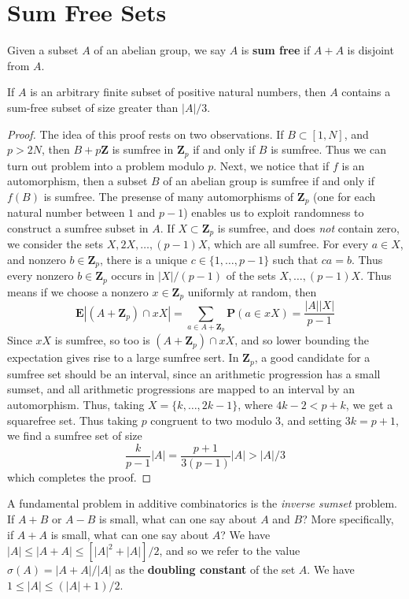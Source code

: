 \section{Sum Free Sets}

Given a subset $A$ of an abelian group, we say $A$ is {\bf sum free} if $A + A$ is disjoint from $A$.

\begin{theorem}
    If $A$ is an arbitrary finite subset of positive natural numbers, then $A$ contains a sum-free subset of size greater than $|A|/3$.
\end{theorem}
\begin{proof}
    The idea of this proof rests on two observations. If $B \subset [1,N]$, and $p > 2N$, then $B + p \mathbf{Z}$ is sumfree in $\mathbf{Z}_p$ if and only if $B$ is sumfree. Thus we can turn out problem into a problem modulo $p$. Next, we notice that if $f$ is an automorphism, then a subset $B$ of an abelian group is sumfree if and only if $f(B)$ is sumfree. The presense of many automorphisms of $\mathbf{Z}_p$ (one for each natural number between $1$ and $p-1$) enables us to exploit randomness to construct a sumfree subset in $A$. If $X \subset \mathbf{Z}_p$ is sumfree, and does {\it not} contain zero, we consider the sets $X,2X, \dots, (p-1)X$, which are all sumfree. For every $a \in X$, and nonzero $b \in \mathbf{Z}_p$, there is a unique $c \in \{ 1, \dots, p-1 \}$ such that $ca = b$. Thus every nonzero $b \in \mathbf{Z}_p$ occurs in $|X|/(p-1)$ of the sets $X,\dots, (p-1)X$. Thus means if we choose a nonzero $x \in \mathbf{Z}_p$ uniformly at random, then
    \[ \mathbf{E} |(A + \mathbf{Z}_p) \cap xX| = \sum_{a \in A + \mathbf{Z}_p} \mathbf{P}(a \in xX) = \frac{|A| |X|}{p-1} \]
    Since $xX$ is sumfree, so too is $(A + \mathbf{Z}_p) \cap xX$, and so lower bounding the expectation gives rise to a large sumfree sert. In $\mathbf{Z}_p$, a good candidate for a sumfree set should be an interval, since an arithmetic progression has a small sumset, and all arithmetic progressions are mapped to an interval by an automorphism. Thus, taking $X = \{ k, \dots, 2k - 1 \}$, where $4k - 2 < p + k$, we get a squarefree set. Thus taking $p$ congruent to two modulo 3, and setting $3k = p + 1$, we find a sumfree set of size
    \[ \frac{k}{p-1} |A| = \frac{p + 1}{3(p-1)} |A| > |A|/3 \]
    which completes the proof.
\end{proof}

A fundamental problem in additive combinatorics is the {\it inverse sumset} problem. If $A + B$ or $A - B$ is small, what can one say about $A$ and $B$? More specifically, if $A + A$ is small, what can one say about $A$? We have $|A| \leq |A + A| \leq [|A|^2 + |A|]/2$, and so we refer to the value $\sigma(A) = |A + A|/|A|$ as the {\bf doubling constant} of the set $A$. We have $1 \leq |A| \leq (|A| + 1)/2$.


